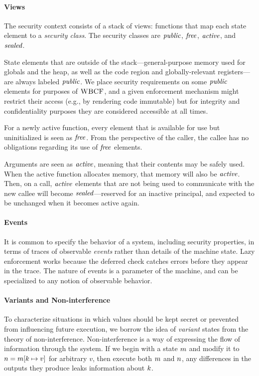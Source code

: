 \documentclass[10pt,conference]{ieeetran}%
\theoremstyle{definition}
\begin{document}
\paragraph*{Views}

The security context consists of a stack of views: functions that map
each state element to a {\it security class}. The security classes are
\(\mathit{public}\), \(\mathit{free}\), \(\mathit{active}\), and \(\mathit{sealed}\).

State elements that are outside of the stack---general-purpose memory used for
globals and the heap, as well as the code region and globally-relevant
registers---are always labeled \(\mathit{public}\). We place security requirements on some
\(\mathit{public}\) elements for purposes of \(\textnormal{\sc WBCF}\), and a given enforcement mechanism
might restrict their access (e.g., by rendering code immutable) but for integrity
and confidentiality purposes they are considered accessible at all times.

For a newly active function, every element that is available for use but uninitialized
is seen as \(\mathit{free}\). From the perspective of the caller, the callee has no obligations
regarding its use of \(\mathit{free}\) elements.

Arguments are seen as \(\mathit{active}\), meaning that their contents may be safely used.
When the active function allocates memory, that memory will also be \(\mathit{active}\).
Then, on a call, \(\mathit{active}\) elements that are not being used to communicate with
the new callee will become \(\mathit{sealed}\)---reserved for an inactive principal,
and expected to be unchanged when it becomes active again.

\paragraph*{Events}

It is common to specify the behavior of a system, including security properties, in
terms of traces of observable {\em events} rather than details of the machine state.
Lazy enforcement works because the deferred check catches errors before they appear
in the trace. The nature of events is a parameter of the machine, and can be specialized
to any notion of observable behavior.

\paragraph*{Variants and Non-interference}

To characterize situations in which values should be kept secret or prevented
from influencing future execution, we borrow the idea of \emph{variant} states
from the theory of non-interference. Non-interference is a way of expressing
the flow of information through the system. If we begin with a state \(m\)
and modify it to \(n = m[k \mapsto v]\) for arbitrary \(v\),
then execute both \(m\) and \(n\), any differences in the outputs they
produce leaks information about \(k\).
\end{document}
